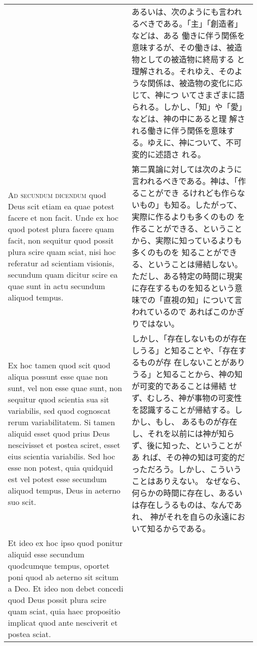 \documentclass[10pt]{jsarticle} %
\begin{document}
\begin{longtable}{p{21em}p{21em}}
&

あるいは、次のようにも言われるべきである。「主」「創造者」などは、ある
働きに伴う関係を意味するが、その働きは、被造物としての被造物に終局する
と理解される。それゆえ、そのような関係は、被造物の変化に応じて、神につ
いてさまざまに語られる。しかし、「知」や「愛」などは、神の中にあると理
解される働きに伴う関係を意味する。ゆえに、神について、不可変的に述語さ
れる。



\\


{\scshape Ad secundum dicendum} quod Deus scit etiam ea quae potest
facere et non facit. Unde ex hoc quod potest plura facere quam facit,
non sequitur quod possit plura scire quam sciat, nisi hoc referatur ad
scientiam visionis, secundum quam dicitur scire ea quae sunt in actu
secundum aliquod tempus.


&

第二異論に対しては次のように言われるべきである。神は、「作ることができ
るけれども作らないもの」も知る。したがって、実際に作るよりも多くのもの
を作ることができる、ということから、実際に知っているよりも多くのものを
知ることができる、ということは帰結しない。ただし、ある特定の時間に現実
に存在するものを知るという意味での「直視の知」について言われているので
あればこのかぎりではない。

\\


Ex hoc tamen quod scit quod aliqua possunt esse quae non sunt, vel non
esse quae sunt, non sequitur quod scientia sua sit variabilis, sed
quod cognoscat rerum variabilitatem. Si tamen aliquid esset quod prius
Deus nescivisset et postea sciret, esset eius scientia variabilis. Sed
hoc esse non potest, quia quidquid est vel potest esse secundum
aliquod tempus, Deus in aeterno suo scit.


&

しかし、「存在しないものが存在しうる」と知ることや、「存在するものが存
在しないことがありうる」と知ることから、神の知が可変的であることは帰結
せず、むしろ、神が事物の可変性を認識することが帰結する。しかし、もし、
あるものが存在し、それを以前には神が知らず、後に知った、ということがあ
れば、その神の知は可変的だっただろう。しかし、こういうことはありえない。
なぜなら、何らかの時間に存在し、あるいは存在しうるものは、なんであれ、
神がそれを自らの永遠において知るからである。

\\


Et ideo ex hoc ipso quod ponitur aliquid esse secundum quodcumque
tempus, oportet poni quod ab aeterno sit scitum a Deo. Et ideo non
debet concedi quod Deus possit plura scire quam sciat, quia haec
propositio implicat quod ante nesciverit et postea sciat.


\end{longtable}
\end{document}
